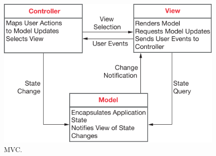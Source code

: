 %
%
%
%
%


\lipsum[1-2]

\begin{figure}%
	\centering%
	\includegraphics{img/sommMVC}%
	\caption{MVC.}
\end{figure}








